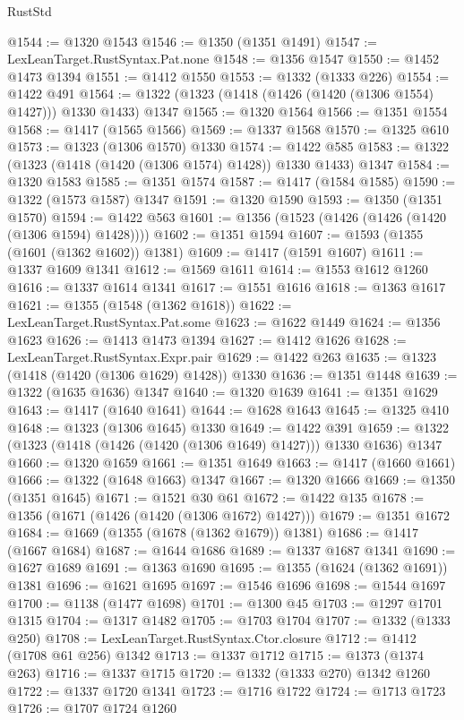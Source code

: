\begin{lexlean}{RustStd}
\begin{coremodule}
@1544 := @1320 @1543
@1546 := @1350 (@1351 @1491)
@1547 := LexLeanTarget.RustSyntax.Pat.none
@1548 := @1356 @1547
@1550 := @1452 @1473 @1394
@1551 := @1412 @1550
@1553 := @1332 (@1333 @226)
@1554 := @1422 @491
@1564 := @1322 (@1323 (@1418 (@1426 (@1420 (@1306 @1554) @1427))) @1330 @1433) @1347
@1565 := @1320 @1564
@1566 := @1351 @1554
@1568 := @1417 (@1565 @1566)
@1569 := @1337 @1568
@1570 := @1325 @610
@1573 := @1323 (@1306 @1570) @1330
@1574 := @1422 @585
@1583 := @1322 (@1323 (@1418 (@1420 (@1306 @1574) @1428)) @1330 @1433) @1347
@1584 := @1320 @1583
@1585 := @1351 @1574
@1587 := @1417 (@1584 @1585)
@1590 := @1322 (@1573 @1587) @1347
@1591 := @1320 @1590
@1593 := @1350 (@1351 @1570)
@1594 := @1422 @563
@1601 := @1356 (@1523 (@1426 (@1426 (@1420 (@1306 @1594) @1428))))
@1602 := @1351 @1594
@1607 := @1593 (@1355 (@1601 (@1362 @1602)) @1381)
@1609 := @1417 (@1591 @1607)
@1611 := @1337 @1609 @1341
@1612 := @1569 @1611
@1614 := @1553 @1612 @1260
@1616 := @1337 @1614 @1341
@1617 := @1551 @1616
@1618 := @1363 @1617
@1621 := @1355 (@1548 (@1362 @1618))
@1622 := LexLeanTarget.RustSyntax.Pat.some
@1623 := @1622 @1449
@1624 := @1356 @1623
@1626 := @1413 @1473 @1394
@1627 := @1412 @1626
@1628 := LexLeanTarget.RustSyntax.Expr.pair
@1629 := @1422 @263
@1635 := @1323 (@1418 (@1420 (@1306 @1629) @1428)) @1330
@1636 := @1351 @1448
@1639 := @1322 (@1635 @1636) @1347
@1640 := @1320 @1639
@1641 := @1351 @1629
@1643 := @1417 (@1640 @1641)
@1644 := @1628 @1643
@1645 := @1325 @410
@1648 := @1323 (@1306 @1645) @1330
@1649 := @1422 @391
@1659 := @1322 (@1323 (@1418 (@1426 (@1420 (@1306 @1649) @1427))) @1330 @1636) @1347
@1660 := @1320 @1659
@1661 := @1351 @1649
@1663 := @1417 (@1660 @1661)
@1666 := @1322 (@1648 @1663) @1347
@1667 := @1320 @1666
@1669 := @1350 (@1351 @1645)
@1671 := @1521 @30 @61
@1672 := @1422 @135
@1678 := @1356 (@1671 (@1426 (@1420 (@1306 @1672) @1427)))
@1679 := @1351 @1672
@1684 := @1669 (@1355 (@1678 (@1362 @1679)) @1381)
@1686 := @1417 (@1667 @1684)
@1687 := @1644 @1686
@1689 := @1337 @1687 @1341
@1690 := @1627 @1689
@1691 := @1363 @1690
@1695 := @1355 (@1624 (@1362 @1691)) @1381
@1696 := @1621 @1695
@1697 := @1546 @1696
@1698 := @1544 @1697
@1700 := @1138 (@1477 @1698)
@1701 := @1300 @45
@1703 := @1297 @1701 @1315
@1704 := @1317 @1482
@1705 := @1703 @1704
@1707 := @1332 (@1333 @250)
@1708 := LexLeanTarget.RustSyntax.Ctor.closure
@1712 := @1412 (@1708 @61 @256) @1342
@1713 := @1337 @1712
@1715 := @1373 (@1374 @263)
@1716 := @1337 @1715
@1720 := @1332 (@1333 @270) @1342 @1260
@1722 := @1337 @1720 @1341
@1723 := @1716 @1722
@1724 := @1713 @1723
@1726 := @1707 @1724 @1260

\end{coremodule}
\end{lexlean}
